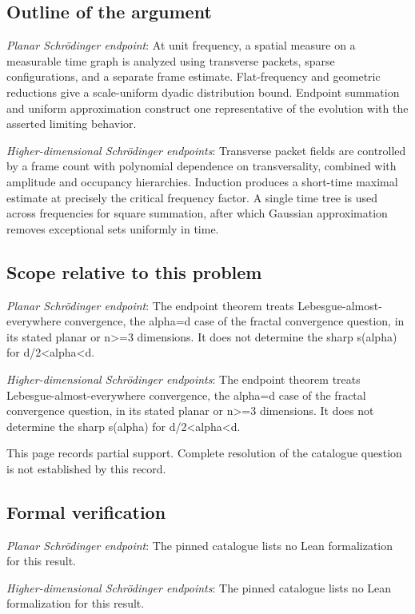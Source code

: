 \documentclass[11pt]{article}
\begin{document}
\subsection{Outline of the argument}
\textit{Planar Schrödinger endpoint}: At unit frequency, a spatial measure on a measurable time graph is analyzed using transverse packets, sparse configurations, and a separate frame estimate. Flat-frequency and geometric reductions give a scale-uniform dyadic distribution bound. Endpoint summation and uniform approximation construct one representative of the evolution with the asserted limiting behavior.

\textit{Higher-dimensional Schrödinger endpoints}: Transverse packet fields are controlled by a frame count with polynomial dependence on transversality, combined with amplitude and occupancy hierarchies. Induction produces a short-time maximal estimate at precisely the critical frequency factor. A single time tree is used across frequencies for square summation, after which Gaussian approximation removes exceptional sets uniformly in time.

\subsection{Scope relative to this problem}
\textit{Planar Schrödinger endpoint}: The endpoint theorem treats Lebesgue-almost-everywhere convergence, the alpha=d case of the fractal convergence question, in its stated planar or n>=3 dimensions. It does not determine the sharp s(alpha) for d/2<alpha<d.

\textit{Higher-dimensional Schrödinger endpoints}: The endpoint theorem treats Lebesgue-almost-everywhere convergence, the alpha=d case of the fractal convergence question, in its stated planar or n>=3 dimensions. It does not determine the sharp s(alpha) for d/2<alpha<d.

This page records partial support. Complete resolution of the catalogue question is not established by this record.

\subsection{Formal verification}
\textit{Planar Schrödinger endpoint}: The pinned catalogue lists no Lean formalization for this result.

\textit{Higher-dimensional Schrödinger endpoints}: The pinned catalogue lists no Lean formalization for this result.
\end{document}
